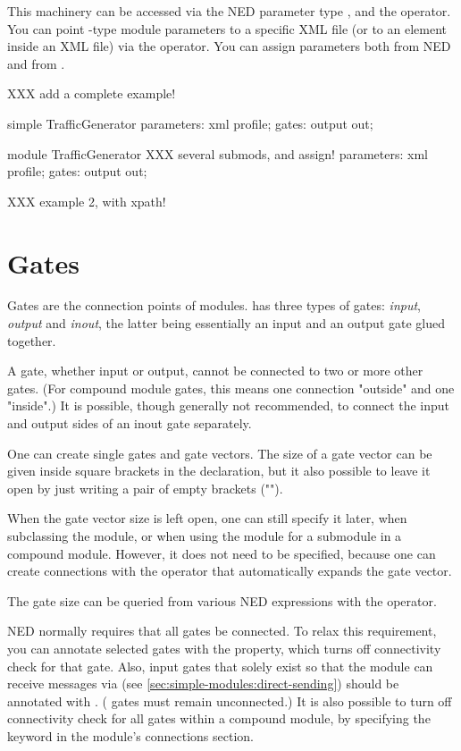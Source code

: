 This machinery can be accessed via the NED parameter type , and the
 operator. You can point -type module parameters
to a specific XML file (or to an element inside an XML file) via the
 operator. You can assign  parameters both from NED
and from .

XXX add a complete example!

\begin{ned}
simple TrafficGenerator {
    parameters:
        xml profile;
    gates:
        output out;
}

module TrafficGenerator {
    XXX several submods, and assign!
    parameters:
        xml profile;
    gates:
        output out;
}
\end{ned}

XXX example 2, with xpath!

\section{Gates}
\label{sec:ch-ned-lang:gates}

Gates are the connection points of modules.  {\opp} has three types of
gates: \textit{input}, \textit{output} and \textit{inout}, the latter being
essentially an input and an output gate glued together.

A gate, whether input or output, cannot be connected to two or more other
gates. (For compound module gates, this means one connection "outside" and
one "inside".)  It is possible, though generally not recommended, to
connect the input and output sides of an inout gate separately.

One can create single gates and gate vectors. The size of a gate vector
can be given inside square brackets in the declaration, but it also possible
to leave it open by just writing a pair of empty brackets ("\ttt{[]}").

When the gate vector size is left open, one can still specify it later,
when subclassing the module, or when using the module for a submodule in a
compound module. However, it does not need to be specified, because
one can create connections with the  operator that
automatically expands the gate vector.

The gate size can be queried from various NED expressions with the
 operator.

NED normally requires that all gates be connected. To relax this
requirement, you can annotate selected gates with the 
property, which turns off connectivity check for that gate. Also, input
gates that solely exist so that the module can receive messages via
 (see \ref{sec:simple-modules:direct-sending}) should
be annotated with . ( gates must remain
unconnected.) It is also possible to turn off connectivity check for all
gates within a compound module, by specifying the
 keyword in the module's connections section.

